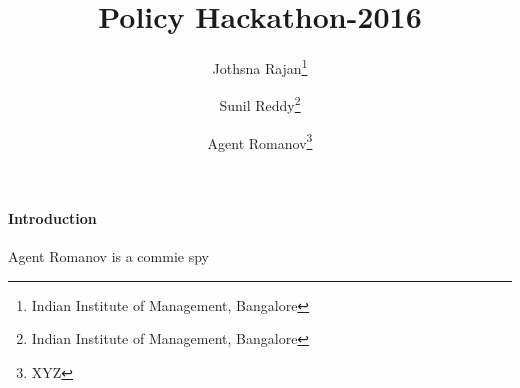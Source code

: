 \documentclass[12pt, a4paper]{article}
\title{Policy Hackathon-2016}
\author{Jothsna Rajan\thanks{Indian Institute of Management, Bangalore} \and Sunil Reddy\thanks{Indian Institute of Management, Bangalore} \and Agent Romanov\thanks{XYZ}}
\begin{document}
\maketitle
\paragraph{Introduction}
Agent Romanov is a commie spy
\end{document}
